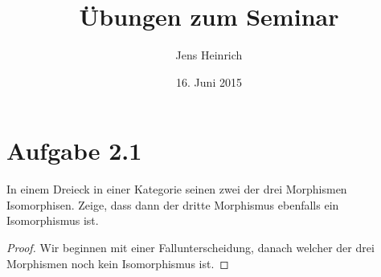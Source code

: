 \documentclass[xcolor=dvipsnames]{beamer}
\title{\"Ubungen zum Seminar \boldfont{Kategorientheorie} }
\author{Jens Heinrich}
\date{16. Juni 2015}
\begin{document}
 
	\maketitle
\section*{Aufgabe 2.1}
	In einem Dreieck 
	in einer Kategorie seinen zwei der drei Morphismen Isomorphisen.
	Zeige, dass dann der dritte Morphismus ebenfalls ein Isomorphismus ist.
	\begin{proof}
		Wir beginnen mit einer Fallunterscheidung, danach welcher der drei Morphismen noch kein Isomorphismus ist.
	\end{proof}
\end{document}
